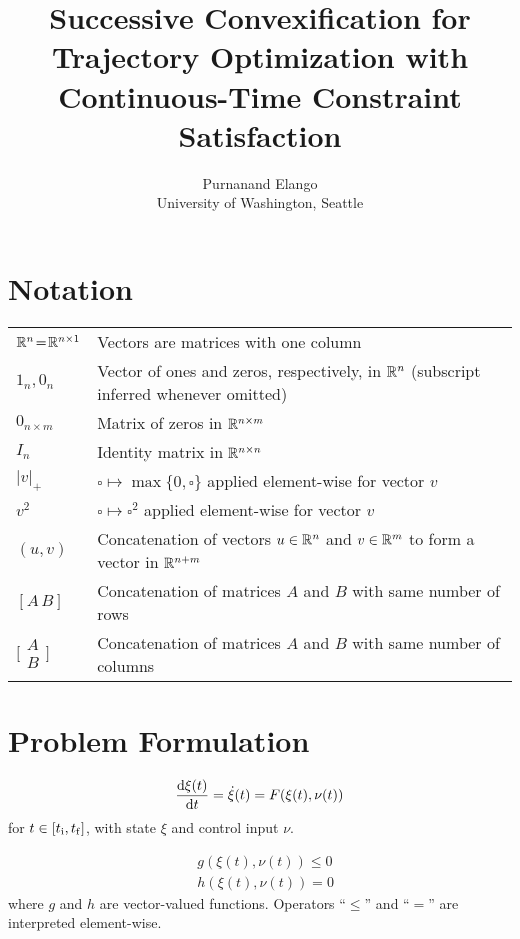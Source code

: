 \documentclass[11pt,a4paper]{article}
\title{{\Large Successive Convexification for Trajectory Optimization with \\Continuous-Time Constraint Satisfaction}\\[0.5cm]{\Large{\ctscvx}}}
\author{{\normalsize Purnanand Elango}\\{\small University of Washington, Seattle}}
\date{}
\begin{document}
\maketitle

\tableofcontents

\section{Notation}

\begin{tabular}{ll}
$\mathbb{R}^{n}\!=\!\mathbb{R}^{n\times 1}$ & Vectors are matrices with one column\\
$1_n,0_n$   & Vector of ones and zeros, respectively, in $\mathbb{R}^{n}$ (subscript inferred whenever omitted)\\
$0_{n\times m}$ & Matrix of zeros in $\mathbb{R}^{n\times m}$\\
$I_n$   & Identity matrix in $\mathbb{R}^{n\times n}$\\
$|v|_+$ & $\square \mapsto \max\{0,\square\}$ applied element-wise for vector $v$\\
$v^2$   & $\square \mapsto \square^2$ applied element-wise for vector $v$\\
$(u,v)$ & Concatenation of vectors $u\in\mathbb{R}^{n}$ and $v\in\mathbb{R}^{m}$ to form a vector in $\mathbb{R}^{n+m}$\\
$[A\,B]$ & Concatenation of matrices $A$ and $B$ with same number of rows\\
$\bigg[\!\!\!\begin{array}{c}A\\[-0.1cm]B\end{array}\!\!\bigg]$ & Concatenation of matrices $A$ and $B$ with same number of columns\\
\end{tabular}

\section{Problem Formulation}

\begin{align}
    \frac{\mathrm{d}\xi(t)}{\mathrm{d}t} = \dot{\xi}(t) = F(\xi(t),\nu(t))\label{sys-dyn}
\end{align}
for $t\in[t_{\mathrm{i}},t_{\mathrm{f}}]$, with state $\xi$ and control input $\nu$.

\begin{align*}
    & g(\xi(t),\nu(t)) \le 0\\
    & h(\xi(t),\nu(t)) = 0
\end{align*}
where $g$ and $h$ are vector-valued functions. Operators ``$\le$'' and ``$=$'' are interpreted element-wise.
\end{document}
